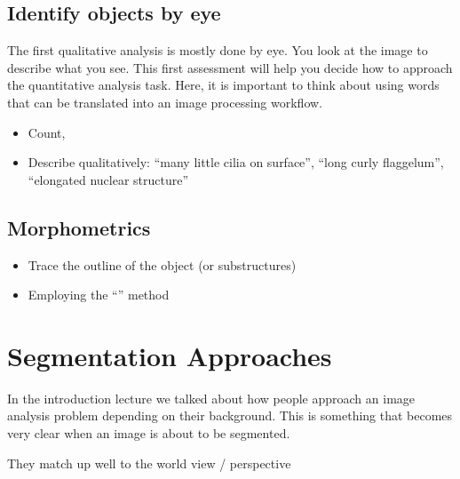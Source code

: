 \documentclass[letterpaper,10pt,english]{sphinxmanual}
\begin{document}
\noindent{}


\section{Identify objects by eye}
\label{\detokenize{04-BasicSegmentation:identify-objects-by-eye}}
\sphinxAtStartPar
The first qualitative analysis is mostly done by eye. You look at the image to describe what you see. This first assessment will help you decide how to approach the quantitative analysis task. Here, it is important to think about using words that can be translated into an image processing workflow.
\begin{itemize}
\item {} 
\sphinxAtStartPar
Count,

\item {} 
\sphinxAtStartPar
Describe qualitatively: “many little cilia on surface”, “long curly flaggelum”, “elongated nuclear structure”

\end{itemize}


\section{Morphometrics}
\label{\detokenize{04-BasicSegmentation:morphometrics}}\begin{itemize}
\item {} 
\sphinxAtStartPar
Trace the outline of the object (or sub\sphinxhyphen{}structures)

\item {} 
\sphinxAtStartPar
Employing the “” method

\end{itemize}


\chapter{Segmentation Approaches}
\label{\detokenize{04-BasicSegmentation:segmentation-approaches}}
\sphinxAtStartPar
In the introduction lecture we talked about how people approach an image analysis problem depending on their background. This is something that becomes very clear when an image is about to be segmented.

\sphinxAtStartPar
They match up well to the world view / perspective
\end{document}
